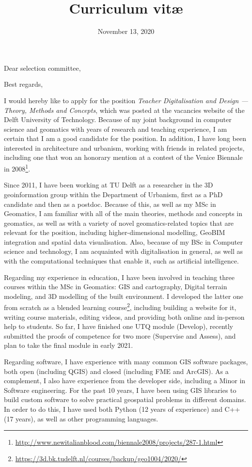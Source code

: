 \documentclass[10pt,a4paper,sans]{moderncv}
\title{Curriculum vit\ae{}}
\begin{document}
\date{November 13, 2020}
\opening{Dear selection committee,}
\closing{Best regards,}
\makelettertitle
I would hereby like to apply for the position \emph{Teacher Digitalisation and Design --- Theory, Methods and Concepts}, which was posted at the vacancies website of the Delft University of Technology. Because of my joint background in computer science and geomatics with years of research and teaching experience, I am certain that I am a good candidate for the position. In addition, I have long been interested in architecture and urbanism, working with friends in related projects, including one that won an honorary mention at a contest of the Venice Biennale in 2008\footnote{\url{http://www.newitalianblood.com/biennale2008/projects/287-1.html}}.

Since 2011, I have been working at TU Delft as a researcher in the 3D geoinformation group within the Department of Urbanism, first as a PhD candidate and then as a postdoc.
Because of this, as well as my MSc in Geomatics, I am familiar with all of the main theories, methods and concepts in geomatics, as well as with a variety of novel geomatics-related topics that are relevant for the position, including higher-dimensional modelling, GeoBIM integration and spatial data visualisation.
Also, because of my BSc in Computer science and technology, I am acquainted with digitalisation in general, as well as with the computational techniques that enable it, such as artificial intelligence.

Regarding my experience in education, I have been involved in teaching three courses within the MSc in Geomatics: GIS and cartography, Digital terrain modeling, and 3D modelling of the built environment.
I developed the latter one from scratch as a blended learning course\footnote{\url{https://3d.bk.tudelft.nl/courses/backup/geo1004/2020/}}, including building a website for it, writing course materials, editing videos, and providing both online and in-person help to students.
So far, I have finished one UTQ module (Develop), recently submitted the proofs of competence for two more (Supervise and Assess), and plan to take the final module in early 2021.

Regarding software, I have experience with many common GIS software packages, both open (including QGIS) and closed (including FME and ArcGIS).
As a complement, I also have experience from the developer side, including a Minor in Software engineering.
For the past 10 years, I have been using GIS libraries to build custom software to solve practical geospatial problems in different domains.
In order to do this, I have used both Python (12 years of experience) and C++ (17 years), as well as other programming languages.
\end{document}
